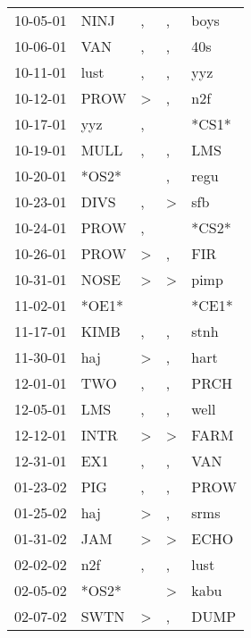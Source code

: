 \begin{supertabular}{lllll}
 10-05-01 &   NINJ &                , &                , &   boys \\
 10-06-01 &    VAN &                , &                , &    40s \\
 10-11-01 &   lust &                , &                , &    yyz \\
 10-12-01 &   PROW &     \textgreater &                , &    n2f \\
 10-17-01 &    yyz &                , &                  &  *CS1* \\
 10-19-01 &   MULL &                , &                , &    LMS \\
 10-20-01 &  *OS2* &                  &                , &   regu \\
 10-23-01 &   DIVS &                , &     \textgreater &    sfb \\
 10-24-01 &   PROW &                , &                  &  *CS2* \\
 10-26-01 &   PROW &     \textgreater &                , &    FIR \\
 10-31-01 &   NOSE &     \textgreater &     \textgreater &   pimp \\
 11-02-01 &  *OE1* &                  &                  &  *CE1* \\
 11-17-01 &   KIMB &                , &                , &   stnh \\
 11-30-01 &    haj &     \textgreater &                , &   hart \\
 12-01-01 &    TWO &                , &                , &   PRCH \\
 12-05-01 &    LMS &                , &                , &   well \\
 12-12-01 &   INTR &     \textgreater &     \textgreater &   FARM \\
 12-31-01 &    EX1 &                , &                , &    VAN \\
 01-23-02 &    PIG &                , &                , &   PROW \\
 01-25-02 &    haj &     \textgreater &                , &   srms \\
 01-31-02 &    JAM &     \textgreater &     \textgreater &   ECHO \\
 02-02-02 &    n2f &                , &                , &   lust \\
 02-05-02 &  *OS2* &                  &     \textgreater &   kabu \\
 02-07-02 &   SWTN &     \textgreater &                , &   DUMP \\

\end{supertabular}
